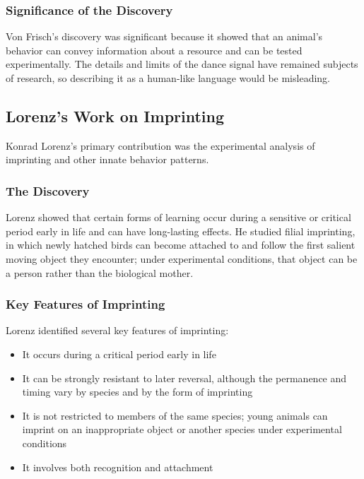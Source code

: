 \subsubsection{Significance of the Discovery}

Von Frisch's discovery was significant because it showed that an animal's behavior can convey information about a resource and can be tested experimentally. The details and limits of the dance signal have remained subjects of research, so describing it as a human-like language would be misleading.

\subsection{Lorenz's Work on Imprinting}

Konrad Lorenz's primary contribution was the experimental analysis of imprinting and other innate behavior patterns.

\subsubsection{The Discovery}

Lorenz showed that certain forms of learning occur during a sensitive or critical period early in life and can have long-lasting effects. He studied filial imprinting, in which newly hatched birds can become attached to and follow the first salient moving object they encounter; under experimental conditions, that object can be a person rather than the biological mother.

\subsubsection{Key Features of Imprinting}

Lorenz identified several key features of imprinting:

\begin{itemize}
\item It occurs during a critical period early in life
\item It can be strongly resistant to later reversal, although the permanence and timing vary by species and by the form of imprinting
\item It is not restricted to members of the same species; young animals can imprint on an inappropriate object or another species under experimental conditions
\item It involves both recognition and attachment
\end{itemize}

